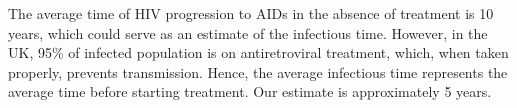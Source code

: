 \documentclass[a4paper,10pt]{article}
\begin{document}
The average time of HIV progression to AIDs in the absence of treatment is 10 years, which could serve as an estimate of the infectious time. However, in the UK, 95\% of infected population is on antiretroviral treatment, which, when taken properly, prevents transmission. Hence, the average infectious time represents the average time before starting treatment. Our estimate is approximately 5 years. 
\end{document}

